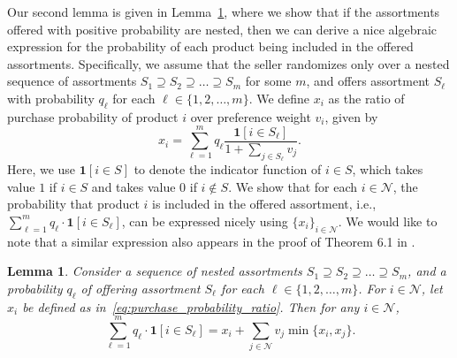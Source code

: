 \documentclass[msom,non-blindrev]{informs3} %
\newtheorem{lemma}[theorem]{Lemma}
\theoremstyle{definition}
\begin{document}
Our second lemma  is given in Lemma~\ref{lemma:visibility_representation}, where we show that if the assortments offered with positive probability are nested, then we can derive a nice algebraic expression for the  probability of each product being included in the offered assortments. Specifically, we assume that the seller randomizes only over a nested sequence of assortments $S_1\supseteq S_2\supseteq\dots \supseteq S_m$ for some $m$, and offers assortment $S_\ell$ with probability $q_\ell$ for each $\ell\in\{1,2,\dots,m\}$. We define $x_i$ as the ratio of purchase probability of product $i$ over preference weight $v_i$, given by
\begin{equation}
	x_i=\sum_{\ell=1}^mq_\ell\dfrac{\bm{1}[i\in S_\ell]}{1+\sum_{j\in S_\ell}v_j}.\label{eq:purchase_probability_ratio}
\end{equation}
Here, we use $\bm{1}[i\in S]$ to denote the indicator function of $i\in S$, which takes value $1$ if $i\in S$ and takes value $0$ if $i\notin S$. We show that for each $i\in\mathcal{N}$, the probability that product $i$ is included in the offered assortment, i.e.,  \mbox{$\sum_{\ell=1}^m q_\ell\cdot \bm{1}[i\in S_\ell]$}, can be expressed nicely using $\{x_i\}_{i\in\mathcal{N}}$. We  would like to note that a similar expression also appears in the proof of Theorem 6.1 in \cite{cao2023revenue}. 

\begin{lemma}\label{lemma:visibility_representation}
	Consider a sequence of nested  assortments $S_1\supseteq S_2\supseteq\dots\supseteq S_m$, and a probability $q_\ell$ of offering assortment $S_\ell$ for each $\ell\in\{1,2,\dots,m\}$. For $i\in \mathcal{N}$, let  $x_i$ be defined as in~\eqref{eq:purchase_probability_ratio}. Then for any $i\in\mathcal{N}$,
	\begin{equation}
		\sum_{\ell=1}^m q_\ell\cdot \bm{1}[i\in S_\ell]=x_i+\sum_{j\in\mathcal{N}}v_j\min\{x_i,x_j\}.\label{eq:visibility_rep}
	\end{equation}
\end{lemma}
\end{document}
